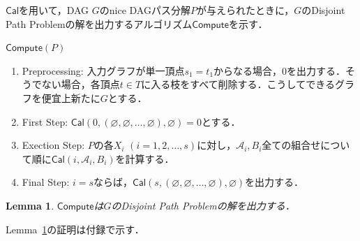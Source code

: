 \documentclass[master]{kuisthesis}		%
\theoremstyle{plain}
\newtheorem{lemma}{Lemma}
\theoremstyle{definition}
\begin{document}
$\mathsf{Cal}$を用いて，DAG $G$のnice DAGパス分解$P$が与えられたときに，$G$のDisjoint Path Problemの解を出力するアルゴリズム$\mathsf{Compute}$を示す．


$\mathsf{Compute}(P)$

\begin{enumerate}
    \item Preprocessing: 入力グラフが単一頂点$s_1=t_1$からなる場合，0を出力する．そうでない場合，各頂点$t \in T$に入る枝をすべて削除する．こうしてできるグラフを便宜上新たに$G$とする．
    \item First Step: $\mathsf{Cal}(0, (\varnothing, \varnothing, \dots, \varnothing), \varnothing) = 0$とする．
    \item Exection Step: $P$の各$X_i$ $(i=1, 2, \dots, s)$に対し，$\mathscr{A}_i, B_i$全ての組合せについて順に$\mathsf{Cal}(i, \mathscr{A}_i, B_i)$を計算する．
    \item Final Step: $i = s$ならば，$\mathsf{Cal}(s, (\varnothing, \varnothing, \dots, \varnothing), \varnothing)$を出力する．
\end{enumerate}


\begin{lemma}\label{dpp}
    $\mathsf{Compute}$は$G$のDisjoint Path Problemの解を出力する．
\end{lemma}

Lemma~\ref{dpp}の証明は付録で示す．
\end{document}

